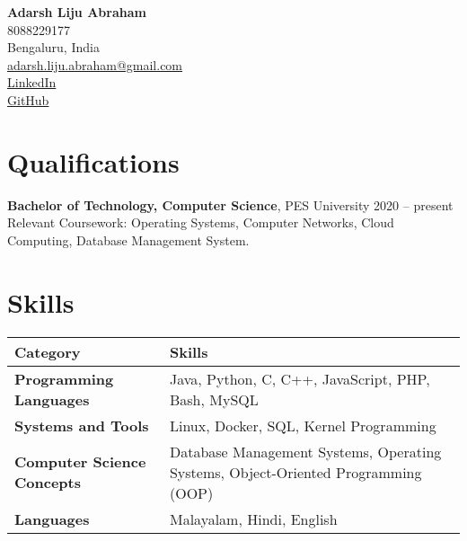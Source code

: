 \documentclass[a4paper,10pt]{article}
\newcommand{\name}[1]{\Huge \textbf{#1} \\[12pt]}
\newcommand{\address}[1]{\small #1 \\}
\begin{document}
\begin{center}
   \name{Adarsh Liju Abraham}
   \address{8088229177 \\ Bengaluru, India}
   \address{\href{mailto:adarsh.liju.abraham@gmail.com}{adarsh.liju.abraham@gmail.com}}
   \address{\href{https://www.linkedin.com/in/adarsh-liju-abraham-880104216/}{LinkedIn} \\ \href{https://github.com/Adarsh-Liju}{GitHub}}
\end{center}

\section*{Qualifications}
\textbf{Bachelor of Technology, Computer Science}, PES University \hfill {2020 – present} \\
Relevant Coursework: Operating Systems, Computer Networks, Cloud Computing, Database Management System.

\section*{Skills}
\begin{tabular}{ @{} l l @{} }
    \textbf{Category} & \textbf{Skills} \\ \hline
    \textbf{Programming Languages} & Java, Python, C, C++, JavaScript, PHP, Bash, MySQL \\ 
    \textbf{Systems and Tools} & Linux, Docker, SQL, Kernel Programming \\ 
    \textbf{Computer Science Concepts} & Database Management Systems, Operating Systems, Object-Oriented Programming (OOP) \\ 
    \textbf{Languages} & Malayalam, Hindi, English \\ 
\end{tabular}
\end{document}
